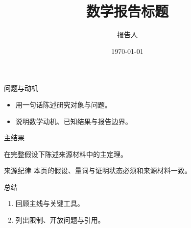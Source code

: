 \documentclass[aspectratio=169,11pt]{ctexbeamer}
\title{数学报告标题}
\author{报告人}
\institute{机构}
\date{\today}
\begin{document}
\begin{frame}
  \titlepage
\end{frame}
\begin{frame}{问题与动机}
  \begin{itemize}
    \item 用一句话陈述研究对象与问题。
    \item 说明数学动机、已知结果与报告边界。
  \end{itemize}
\end{frame}
\begin{frame}{主结果}
  \begin{theorem}
    在完整假设下陈述来源材料中的主定理。
  \end{theorem}
  \begin{alertblock}{来源纪律}
    本页的假设、量词与证明状态必须和来源材料一致。
  \end{alertblock}
\end{frame}
\begin{frame}{总结}
  \begin{enumerate}
    \item 回顾主线与关键工具。
    \item 列出限制、开放问题与引用。
  \end{enumerate}
\end{frame}
\end{document}
